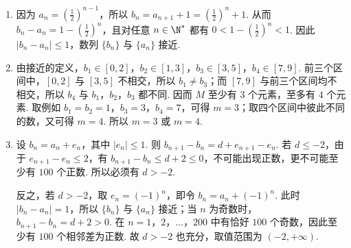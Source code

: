\begin{solution}
\begin{enumerate}
\item 因为 \(a_n=\left(\frac12\right)^{n-1}\)，所以 \(b_n=a_{n+1}+1=\left(\frac12\right)^n+1\). 从而 \(b_n-a_n=1-\left(\frac12\right)^n\)，且对任意 \(n\in\N^*\) 都有 \(0<1-\left(\frac12\right)^n<1\). 因此 \(\lvert b_n-a_n\rvert\le1\)，数列 \(\{b_n\}\) 与 \(\{a_n\}\) 接近.
\item 由接近的定义，\(b_1\in[0,2]\)，\(b_2\in[1,3]\)，\(b_3\in[3,5]\)，\(b_4\in[7,9]\). 前三个区间中，\([0,2]\) 与 \([3,5]\) 不相交，所以 \(b_1\ne b_3\)；而 \([7,9]\) 与前三个区间均不相交，所以 \(b_4\) 与 \(b_1\)，\(b_2\)，\(b_3\) 都不同. 因而 \(M\) 至少有 \(3\) 个元素，至多有 \(4\) 个元素. 取例如 \(b_1=b_2=1\)，\(b_3=3\)，\(b_4=7\)，可得 \(m=3\)；取四个区间中彼此不同的数，又可得 \(m=4\). 所以 \(m=3\) 或 \(m=4\).
\item 设 \(b_n=a_n+e_n\)，其中 \(\lvert e_n\rvert\le1\). 则 \(b_{n+1}-b_n=d+e_{n+1}-e_n\). 若 \(d\le-2\)，由于 \(e_{n+1}-e_n\le2\)，有 \(b_{n+1}-b_n\le d+2\le0\)，不可能出现正数，更不可能至少有 \(100\) 个正数. 所以必须有 \(d>-2\).

反之，若 \(d>-2\)，取 \(e_n=(-1)^n\)，即令 \(b_n=a_n+(-1)^n\). 此时 \(\lvert b_n-a_n\rvert=1\)，所以 \(\{b_n\}\) 与 \(\{a_n\}\) 接近；当 \(n\) 为奇数时，\(b_{n+1}-b_n=d+2>0\). 在 \(n=1\)，\(2\)，\(\ldots\)，\(200\) 中有恰好 \(100\) 个奇数，因此至少有 \(100\) 个相邻差为正数. 故 \(d>-2\) 也充分，取值范围为 \((-2,+\infty)\).
\end{enumerate}
\end{solution}
